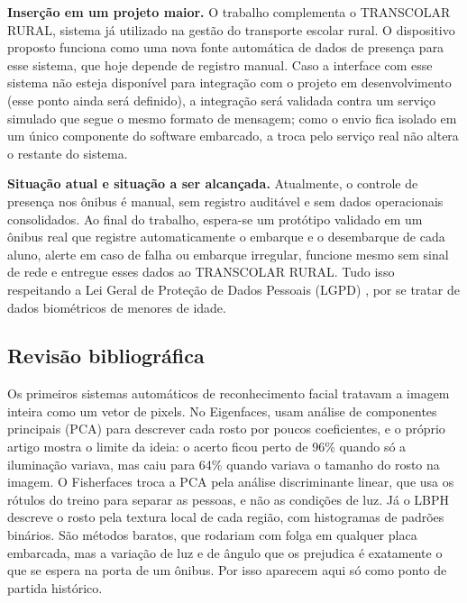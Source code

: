 \documentclass[
    12pt,
    oneside,
    a4paper,
    article,
    english,
    brazil
    ]{abntex2}
\begin{document}
\textbf{Inserção em um projeto maior.} O trabalho complementa o TRANSCOLAR
RURAL, sistema já utilizado na gestão do transporte escolar rural. O dispositivo
proposto funciona como uma nova fonte automática de dados de presença para esse
sistema, que hoje depende de registro manual. Caso a interface com esse
sistema não esteja disponível para integração com o projeto em desenvolvimento
(esse ponto ainda será definido), a integração será validada contra um serviço
simulado que segue o mesmo formato de mensagem; como o envio fica isolado em um
único componente do software embarcado, a troca pelo serviço real não altera o
restante do sistema.

\textbf{Situação atual e situação a ser alcançada.} Atualmente, o controle de
presença nos ônibus é manual, sem registro auditável e sem dados operacionais
consolidados. Ao final do trabalho, espera-se um protótipo validado em um
ônibus real que registre automaticamente o embarque e o desembarque de cada
aluno, alerte em caso de falha ou embarque irregular, funcione mesmo sem sinal
de rede e entregue esses dados ao TRANSCOLAR RURAL. Tudo isso respeitando a
Lei Geral de Proteção de Dados Pessoais (LGPD) \cite{brasil2018lgpd}, por se
tratar
de dados biométricos de menores de idade.

\subsection{Revisão bibliográfica}

Os primeiros sistemas automáticos de reconhecimento facial tratavam a imagem
inteira como um vetor de pixels. No Eigenfaces, 
usam análise de componentes principais (PCA) para descrever cada rosto por
poucos coeficientes, e o próprio artigo mostra o limite da ideia: o acerto
ficou perto de 96\% quando só a iluminação variava, mas caiu para 64\% quando
variava o tamanho do rosto na imagem. O Fisherfaces
\cite{belhumeur1997eigenfaces} troca a PCA pela análise discriminante linear,
que usa os rótulos do treino para separar as pessoas, e não as condições de
luz. Já o LBPH \cite{ahonen2004face} descreve o rosto pela textura local de
cada região, com histogramas de padrões binários. São métodos baratos, que
rodariam com folga em qualquer placa embarcada, mas a variação de luz e de
ângulo que os prejudica é exatamente o que se espera na porta de um ônibus.
Por isso aparecem aqui só como ponto de partida histórico.
\end{document}
